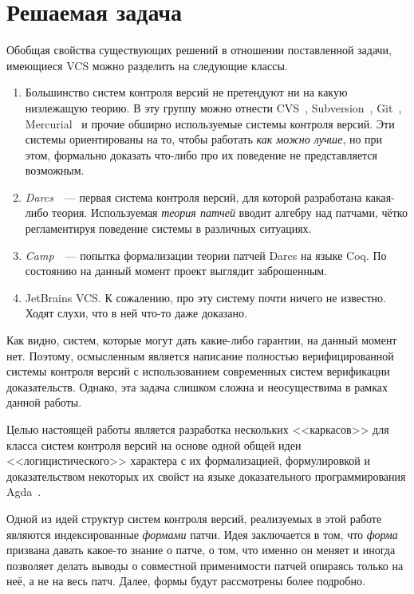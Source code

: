 \section{Решаемая задача}

Обобщая свойства существующих решений в отношении поставленной
задачи, имеющиеся VCS можно разделить на следующие классы.

\begin{enumerate}
\item Большинство систем контроля версий не претендуют ни на какую
  низлежащую теорию. В эту группу можно отнести CVS~\cite{cvs},
  Subversion~\cite{svnbook}, Git~\cite{progit},
  Mercurial~\cite{mercurial} %
  и прочие обширно используемые системы контроля версий. Эти системы
  ориентированы на то, чтобы работать \emph{как можно лучше}, но при
  этом, формально доказать что-либо про их поведение не представляется
  возможным.
\item \emph{Darcs}~\cite{darcs}~--- первая система контроля версий,
  для которой разработана какая-либо теория. Используемая \emph{теория
    патчей} вводит алгебру над патчами, чётко регламентируя поведение
  системы в различных ситуациях.
\item \emph{Camp}~\cite{camp}~--- попытка формализации теории патчей
  Darcs на языке Coq. По состоянию на данный момент проект выглядит
  заброшенным.
\item JetBrains VCS. К сожалению, про эту систему почти ничего не
  известно. Ходят слухи, что в ней что-то даже доказано.
\end{enumerate}

Как видно, систем, которые могут дать какие-либо гарантии, на данный
момент нет. Поэтому, осмысленным является написание полностью
верифицированной системы контроля версий с использованием современных
систем верификации доказательств. Однако, эта задача слишком сложна и
неосуществима в рамках данной работы.

Целью настоящей работы является разработка нескольких <<каркасов>> для
класса систем контроля версий на основе одной общей идеи
<<логицистического>> характера с их формализацией, формулировкой и
доказательством некоторых их свойст на языке доказательного
программирования Agda~\cite{agda}.

Одной из идей структур систем контроля версий, реализуемых в этой
работе являются индексированные \emph{формами} патчи. Идея заключается
в том, что \emph{форма} призвана давать какое-то знание о патче, о
том, что именно он меняет и иногда позволяет делать выводы о
совместной применимости патчей опираясь только на неё, а не на весь
патч. Далее, формы будут рассмотрены более подробно.


